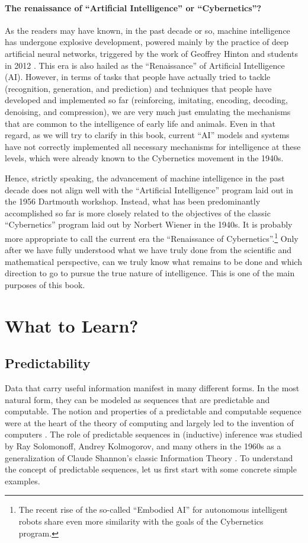 \documentclass[../../book-main.tex]{subfiles}
\begin{document}
\paragraph{The renaissance of ``Artificial Intelligence'' or ``Cybernetics''?}
As the readers may have known, in the past decade or so, machine intelligence has undergone explosive development, powered mainly by the practice of deep artificial neural networks, triggered by the work of Geoffrey Hinton and students in 2012 \cite{krizhevsky2012imagenet}. This era is also hailed as the ``Renaissance'' of Artificial Intelligence (AI). However, in terms of tasks that people have actually tried to tackle (recognition, generation, and prediction) and techniques that people have developed and implemented so far (reinforcing, imitating, encoding, decoding, denoising, and compression), we are very much just emulating the mechanisms that are common to the intelligence of early life and animals. Even in that regard, as we will try to clarify in this book, current ``AI'' models and systems have not correctly implemented all necessary mechanisms for intelligence at these levels, which were already known to the Cybernetics movement in the 1940s. 

Hence, strictly speaking, the advancement of machine intelligence in the past decade does not align well with the ``Artificial Intelligence'' program laid out in the 1956 Dartmouth workshop. Instead, what has been predominantly accomplished so far is more closely related to the objectives of the classic ``Cybernetics'' program laid out by Norbert Wiener in the 1940s. It is probably more appropriate to call the current era the ``Renaissance of Cybernetics''.\footnote{The recent rise of the so-called ``Embodied AI'' for autonomous intelligent robots share even more similarity with the goals of the Cybernetics program.} Only after we have fully understood what we have truly done from the scientific and mathematical perspective, can we truly know what remains to be done and which direction to go to pursue the true nature of intelligence. This is one of the main purposes of this book. 


\section{What to Learn?}
\label{sec:what-to-learn}



\subsection{Predictability}
\label{sec:predictability}
Data that carry useful information manifest in many different forms. In the most natural form, they can be modeled as sequences that are predictable and computable. The notion and properties of a predictable and computable sequence were at the heart of the theory of computing and largely led to the invention of computers \cite{Turing-1936}. The role of predictable sequences in (inductive) inference was studied by Ray Solomonoff, Andrey Kolmogorov, and many others in the 1960s \cite{Kolmogorov1998OnTO} as a generalization of Claude Shannon's classic Information Theory \cite{Shannon-1948}. To understand the concept of predictable sequences, let us first start with some concrete simple examples. 
\end{document}
